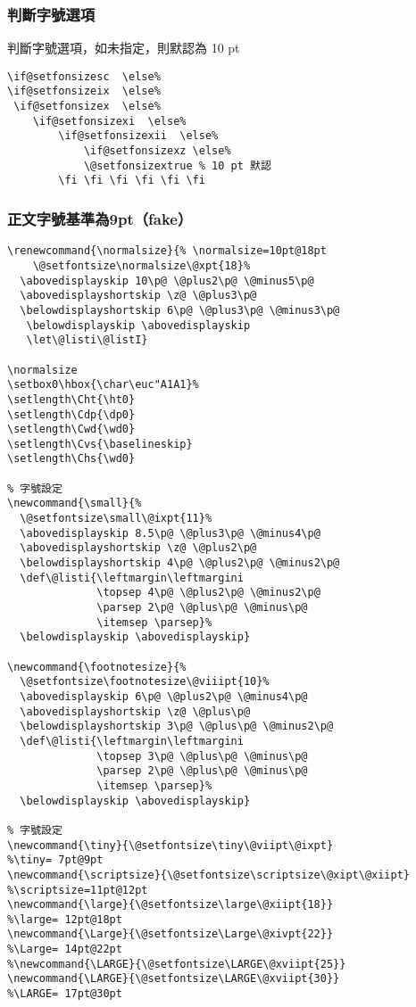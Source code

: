 \subsubsection{判斷字號選項}
判斷字號選項，如未指定，則默認為 10 pt
\begin{lstlisting}[firstnumber=131]
\if@setfonsizesc  \else%
\if@setfonsizeix  \else%
 \if@setfonsizex  \else%
 	\if@setfonsizexi  \else%
 		\if@setfonsizexii  \else%
 			\if@setfonsizexz \else%
 			\@setfonsizextrue % 10 pt 默認
 		\fi	\fi \fi \fi \fi \fi
\end{lstlisting}

\subsubsection{正文字號基準為9pt（fake）}
\begin{lstlisting}[firstnumber=143]
%% 定義正文字號
\renewcommand{\normalsize}{% \normalsize=10pt@18pt
    \@setfontsize\normalsize\@xpt{18}%
  \abovedisplayskip 10\p@ \@plus2\p@ \@minus5\p@
  \abovedisplayshortskip \z@ \@plus3\p@
  \belowdisplayshortskip 6\p@ \@plus3\p@ \@minus3\p@
   \belowdisplayskip \abovedisplayskip
   \let\@listi\@listI}

\normalsize
\setbox0\hbox{\char\euc"A1A1}%
\setlength\Cht{\ht0}
\setlength\Cdp{\dp0}
\setlength\Cwd{\wd0}
\setlength\Cvs{\baselineskip}
\setlength\Chs{\wd0}

% 字號設定
\newcommand{\small}{%
  \@setfontsize\small\@ixpt{11}%
  \abovedisplayskip 8.5\p@ \@plus3\p@ \@minus4\p@
  \abovedisplayshortskip \z@ \@plus2\p@
  \belowdisplayshortskip 4\p@ \@plus2\p@ \@minus2\p@
  \def\@listi{\leftmargin\leftmargini
              \topsep 4\p@ \@plus2\p@ \@minus2\p@
              \parsep 2\p@ \@plus\p@ \@minus\p@
              \itemsep \parsep}%
  \belowdisplayskip \abovedisplayskip}

\newcommand{\footnotesize}{%
  \@setfontsize\footnotesize\@viiipt{10}%
  \abovedisplayskip 6\p@ \@plus2\p@ \@minus4\p@
  \abovedisplayshortskip \z@ \@plus\p@
  \belowdisplayshortskip 3\p@ \@plus\p@ \@minus2\p@
  \def\@listi{\leftmargin\leftmargini
              \topsep 3\p@ \@plus\p@ \@minus\p@
              \parsep 2\p@ \@plus\p@ \@minus\p@
              \itemsep \parsep}%
  \belowdisplayskip \abovedisplayskip}

% 字號設定
\newcommand{\tiny}{\@setfontsize\tiny\@viipt\@ixpt}					    %\tiny= 7pt@9pt
\newcommand{\scriptsize}{\@setfontsize\scriptsize\@xipt\@xiipt} %\scriptsize=11pt@12pt
\newcommand{\large}{\@setfontsize\large\@xiipt{18}}				      %\large= 12pt@18pt
\newcommand{\Large}{\@setfontsize\Large\@xivpt{22}}				      %\Large= 14pt@22pt
%\newcommand{\LARGE}{\@setfontsize\LARGE\@xviipt{25}}
\newcommand{\LARGE}{\@setfontsize\LARGE\@xviipt{30}}  			    %\LARGE= 17pt@30pt


\end{lstlisting}
